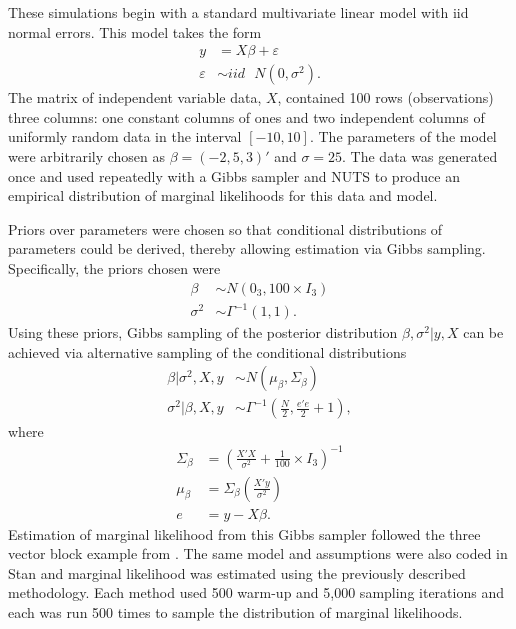 \documentclass[twocolumn]{article}
\newcommand{\ep}{\varepsilon}
\begin{document}


These simulations begin with a standard multivariate linear model with iid normal errors. This model takes the form
\begin{subequations}
\begin{align}
	y &= X\beta + \ep \\
	\ep &\sim iid \mbox{ }N(0, \sigma^2). 
\end{align}
\end{subequations}
The matrix of independent variable data, $X$, contained 100 rows (observations) three columns: one constant columns of ones and two independent columns of uniformly random data in the interval $[-10, 10]$. The parameters of the model were arbitrarily chosen as $\beta = (-2, 5, 3)'$ and $\sigma = 25$. The data was generated once and used repeatedly with a Gibbs sampler and NUTS to produce an empirical distribution of marginal likelihoods for this data and model.

Priors over parameters were chosen so that conditional distributions of parameters could be derived, thereby allowing estimation via Gibbs sampling. Specifically, the priors chosen were
\begin{subequations}
\begin{align}
	\beta &\sim N(0_3, 100\times I_3)\\
	\sigma^2 &\sim \Gamma^{-1}(1, 1).
\end{align}
\end{subequations}
Using these priors, Gibbs sampling of the posterior distribution $\beta, \sigma^2|y, X$ can be achieved via alternative sampling of the conditional distributions
\begin{subequations}
\begin{align}
	\beta|\sigma^2, X, y &\sim N(\mu_\beta, \Sigma_\beta) \\
	\sigma^2|\beta, X, y &\sim \Gamma^{-1}\left(\frac{N}2, \frac{e'e}2 + 1\right),
\end{align}
\end{subequations}
where
\begin{subequations}
\begin{align}
	\Sigma_\beta &= \left(\frac{X'X}{\sigma^2} + \frac1{100}\times I_3\right)^{-1}\\
	\mu_\beta &= \Sigma_\beta\left(\frac{X'y}{\sigma^2}\right)\\
	e &= y - X\beta.
\end{align}
\end{subequations}
Estimation of marginal likelihood from this Gibbs sampler followed the three vector block example from \cite{Chib}. The same model and assumptions were also coded in Stan and marginal likelihood was estimated using the previously described methodology. Each method used 500 warm-up and 5,000 sampling iterations and each was run 500 times to sample the distribution of marginal likelihoods.
\end{document}

